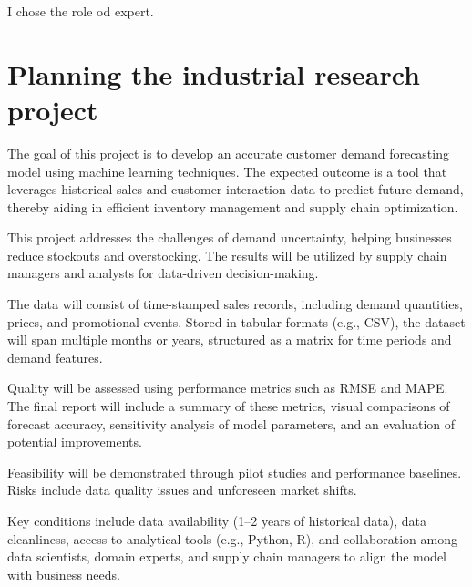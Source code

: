 \documentclass[12pt]{article}
\date{}
\begin{document}
\maketitle

I chose the role od expert.


\section{Planning the industrial research project}

The goal of this project is to develop an accurate customer demand forecasting model using machine learning techniques. The expected outcome is a tool that leverages historical sales and customer interaction data to predict future demand, thereby aiding in efficient inventory management and supply chain optimization.

This project addresses the challenges of demand uncertainty, helping businesses reduce stockouts and overstocking. The results will be utilized by supply chain managers and analysts for data-driven decision-making.

The data will consist of time-stamped sales records, including demand quantities, prices, and promotional events. Stored in tabular formats (e.g., CSV), the dataset will span multiple months or years, structured  as a matrix  for time periods and demand features.

Quality will be assessed using performance metrics such as RMSE and MAPE. The final report will include a summary of these metrics, visual comparisons of forecast accuracy, sensitivity analysis of model parameters, and an evaluation of potential improvements.

Feasibility will be demonstrated through pilot studies and performance baselines. Risks include data quality issues  and unforeseen market shifts. 

Key conditions include data availability (1–2 years of historical data), data cleanliness, access to analytical tools (e.g., Python, R), and collaboration among data scientists, domain experts, and supply chain managers to align the model with business needs.
\end{document}
